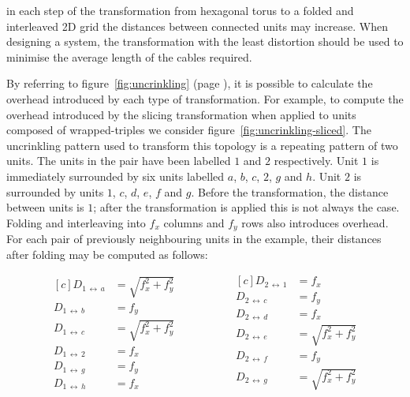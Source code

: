 			\label{sec:distortion}
			
			in each step of the transformation from hexagonal torus to a folded and
			interleaved 2D grid the distances between connected units may increase.
			When designing a system, the transformation with the least distortion
			should be used to minimise the average length of the cables required.
			
			By referring to figure~\ref{fig:uncrinkling} (page
			\pageref{fig:uncrinkling}), it is possible to calculate the overhead
			introduced by each type of transformation.  For example, to compute the
			overhead introduced by the slicing transformation when applied to units
			composed of wrapped-triples we consider
			figure~\ref{fig:uncrinkling-sliced}. The uncrinkling pattern used to
			transform this topology is a repeating pattern of two units. The units in
			the pair have been labelled $1$ and $2$ respectively. Unit $1$ is
			immediately surrounded by six units labelled $a$, $b$, $c$, $2$, $g$ and
			$h$. Unit $2$ is surrounded by units $1$, $c$, $d$, $e$, $f$ and $g$.
			Before the transformation, the distance between units is $1$; after the
			transformation is applied this is not always the case. Folding and
			interleaving into $f_x$ columns and $f_y$ rows also introduces overhead.
			For each pair of previously neighbouring units in the example, their
			distances after folding may be computed as follows:
			
			\begin{equation*}
				\begin{aligned}[c]
					D_{1\,\leftrightarrow{}\,a} &= \sqrt{f_x^2 + f_y^2} \\
					D_{1\,\leftrightarrow{}\,b} &= f_y \\
					D_{1\,\leftrightarrow{}\,c} &= \sqrt{f_x^2 + f_y^2} \\
					D_{1\,\leftrightarrow{}\,2} &= f_x \\
					D_{1\,\leftrightarrow{}\,g} &= f_y \\
					D_{1\,\leftrightarrow{}\,h} &= f_x
				\end{aligned}
				\hspace{2cm}
				\begin{aligned}[c]
					D_{2\,\leftrightarrow{}\,1} &= f_x \\
					D_{2\,\leftrightarrow{}\,c} &= f_y \\
					D_{2\,\leftrightarrow{}\,d} &= f_x \\
					D_{2\,\leftrightarrow{}\,e} &= \sqrt{f_x^2 + f_y^2} \\
					D_{2\,\leftrightarrow{}\,f} &= f_y \\
					D_{2\,\leftrightarrow{}\,g} &= \sqrt{f_x^2 + f_y^2}
				\end{aligned}
			\end{equation*}
			
